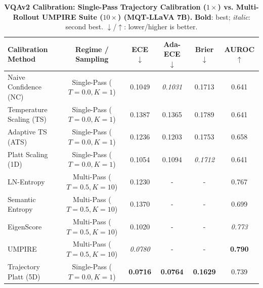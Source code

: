 \begin{table}[t]
\setlength{\tabcolsep}{4pt}
\renewcommand{\arraystretch}{1.05}
\centering
\footnotesize
\begin{tabular}{lccccc}
\toprule
\textbf{Calibration Method} & \textbf{Regime / Sampling} & \textbf{ECE} $\downarrow$ & \textbf{Ada-ECE} $\downarrow$ & \textbf{Brier} $\downarrow$ & \textbf{AUROC} $\uparrow$ \\
\midrule
Naive Confidence (NC) & Single-Pass ($T = 0.0, K = 1$) & 0.1049 & \textit{0.1031} & 0.1713 & 0.641 \\
Temperature Scaling (TS) & Single-Pass ($T = 0.0, K = 1$) & 0.1387 & 0.1365 & 0.1789 & 0.641 \\
Adaptive TS (ATS) & Single-Pass ($T = 0.0, K = 1$) & 0.1236 & 0.1203 & 0.1753 & 0.658 \\
Platt Scaling (1D) & Single-Pass ($T = 0.0, K = 1$) & 0.1054 & 0.1094 & \textit{0.1712} & 0.641 \\
LN-Entropy & Multi-Pass ($T = 0.5, K = 10$) & 0.1230 & - & - & 0.767 \\
Semantic Entropy & Multi-Pass ($T = 0.5, K = 10$) & 0.1370 & - & - & 0.699 \\
EigenScore & Multi-Pass ($T = 0.5, K = 10$) & 0.1020 & - & - & \textit{0.773} \\
UMPIRE & Multi-Pass ($T = 0.5, K = 10$) & \textit{0.0780} & - & - & \textbf{0.790} \\
Trajectory Platt (5D) & Single-Pass ($T = 0.0, K = 1$) & \textbf{0.0716} & \textbf{0.0764} & \textbf{0.1629} & 0.739 \\
\bottomrule
\end{tabular}
\caption{\textbf{VQAv2 Calibration: Single-Pass Trajectory Calibration ($1\times$) vs. Multi-Rollout UMPIRE Suite ($10\times$) (MQT-LLaVA 7B).} \textbf{Bold}: best; \textit{italic}: second best. $\downarrow$/$\uparrow$: lower/higher is better.}
\label{tab:vqav2_multirollout_mqt}
\end{table}
